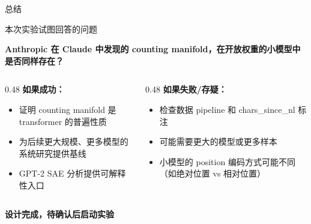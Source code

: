\begin{frame}{总结}
\small
\begin{block}{本次实验试图回答的问题}
\begin{center}
\textbf{Anthropic 在 Claude 中发现的 counting manifold，在开放权重的小模型中是否同样存在？}
\end{center}
\end{block}

\vspace{0.3em}
\begin{columns}[T,onlytextwidth]
\begin{column}{0.48\linewidth}
\textbf{如果成功：}
\begin{itemize}
  \item 证明 counting manifold 是 transformer 的普遍性质
  \item 为后续更大规模、更多模型的系统研究提供基线
  \item GPT-2 SAE 分析提供可解释性入口
\end{itemize}
\end{column}
\begin{column}{0.48\linewidth}
\textbf{如果失败/存疑：}
\begin{itemize}
  \item 检查数据 pipeline 和 chars\_since\_nl 标注
  \item 可能需要更大的模型或更多样本
  \item 小模型的 position 编码方式可能不同（如绝对位置 vs 相对位置）
\end{itemize}
\end{column}
\end{columns}

\vspace{0.5em}
\begin{center}
\large\textcolor{cmblue}{\textbf{设计完成，待确认后启动实验}}
\end{center}
\end{frame}

